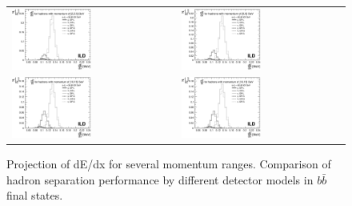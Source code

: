 \documentclass[preprint]{elsarticle}
\begin{document}
\begin{figure}[h!]
\centering
\begin{tabular}{ll}
  \includegraphics[width=0.5\textwidth]{figures_Methods/separation_had_2GeV_models_v2.eps} & 
  \includegraphics[width=0.5\textwidth]{figures_Methods/separation_had_5GeV_models_v2.eps} \\ 
  \includegraphics[width=0.5\textwidth]{figures_Methods/separation_had_10GeV_models_v2.eps} & 
  \includegraphics[width=0.5\textwidth]{figures_Methods/separation_had_10GeV_models_v2.eps} 	
\end{tabular}
\caption{Projection of dE/dx for several momentum ranges. Comparison of hadron separation performance by different detector models in $b\bar{b}$ final states.}
\label{fig_dEdx_1}
\end{figure}
\end{document}
